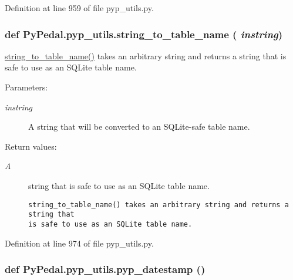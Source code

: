 Definition at line 959 of file pyp\_\-utils.py.\hypertarget{namespacePyPedal_1_1pyp__utils_fc1754422578dce211ca2b92dd93290b}{
\subsubsection[string\_\-to\_\-table\_\-name]{\setlength{\rightskip}{0pt plus 5cm}def Py\-Pedal.pyp\_\-utils.string\_\-to\_\-table\_\-name ( {\em instring})}}
\label{namespacePyPedal_1_1pyp__utils_fc1754422578dce211ca2b92dd93290b}


\hyperlink{namespacePyPedal_1_1pyp__utils_fc1754422578dce211ca2b92dd93290b}{string\_\-to\_\-table\_\-name()} takes an arbitrary string and returns a string that is safe to use as an SQLite table name. 

\begin{Desc}
\item[Parameters:]
\begin{description}
\item[{\em instring}]A string that will be converted to an SQLite-safe table name. \end{description}
\end{Desc}
\begin{Desc}
\item[Return values:]
\begin{description}
\item[{\em A}]string that is safe to use as an SQLite table name.

\footnotesize\begin{verbatim}string_to_table_name() takes an arbitrary string and returns a string that
is safe to use as an SQLite table name.
\end{verbatim}
\normalsize
 \end{description}
\end{Desc}


Definition at line 974 of file pyp\_\-utils.py.\hypertarget{namespacePyPedal_1_1pyp__utils_bded02aaf1c6d3412cbdf3f3329b90cc}{
\subsubsection[pyp\_\-datestamp]{\setlength{\rightskip}{0pt plus 5cm}def Py\-Pedal.pyp\_\-utils.pyp\_\-datestamp ()}}
\label{namespacePyPedal_1_1pyp__utils_bded02aaf1c6d3412cbdf3f3329b90cc}


